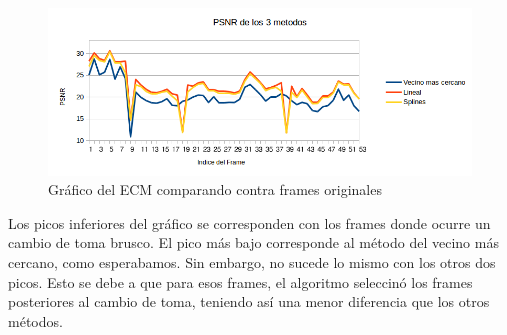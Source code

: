 \begin{figure}[h!]
  \caption{Gráfico del ECM comparando contra frames originales}
  \centering
    \includegraphics[scale=0.75]{imagenes/PSNRGangnam.png}
\end{figure}

Los picos inferiores del gráfico se corresponden con los frames donde ocurre un cambio de toma brusco. El pico más bajo corresponde al método del vecino más cercano, como esperabamos. Sin embargo, no sucede lo mismo con los otros dos picos. Esto se debe a que para esos frames, el algoritmo seleccinó los frames posteriores al cambio de toma, teniendo así una menor diferencia que los otros métodos.







